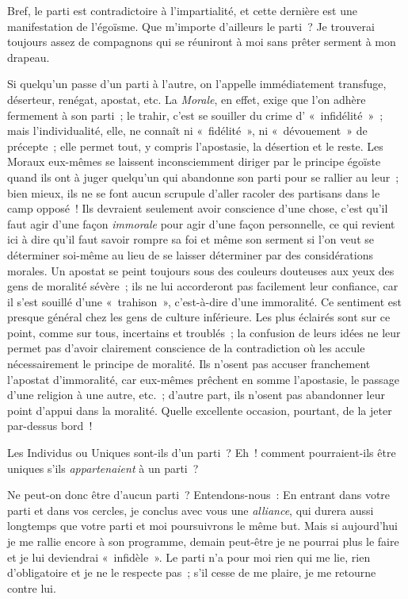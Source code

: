 \documentclass[french,twoside]{book} %
\begin{document}
Bref, le parti est contradictoire à l’impartialité, et cette dernière est une manifestation de l’égoïsme. Que m’importe d’ailleurs le parti ? Je trouverai toujours assez de compagnons qui se réuniront à moi sans prêter serment à mon drapeau.\par
Si quelqu’un passe d’un parti à l’autre, on l’appelle immédiatement transfuge, déserteur, renégat, apostat, etc. La \emph{Morale}, en effet, exige que l’on adhère fermement à son parti ; le trahir, c’est se souiller du crime d’ « infidélité » ; mais l’individualité, elle, ne connaît ni « fidélité », ni « dévouement » de précepte ; elle permet tout, y compris l’apostasie, la désertion et le reste. Les Moraux eux-mêmes se laissent inconsciemment diriger par le principe égoïste quand ils ont à juger quelqu’un qui abandonne son parti pour se rallier au leur ; bien mieux, ils ne se font aucun scrupule d’aller racoler des partisans dans le camp opposé ! Ils devraient seulement avoir conscience  d’une chose, c’est qu’il faut agir d’une façon \emph{immorale} pour agir d’une façon personnelle, ce qui revient ici à dire qu’il faut savoir rompre sa foi et même son serment si l’on veut se déterminer soi-même au lieu de se laisser déterminer par des considérations morales. Un apostat se peint toujours sous des couleurs douteuses aux yeux des gens de moralité sévère ; ils ne lui accorderont pas facilement leur confiance, car il s’est souillé d’une « trahison », c’est-à-dire d’une immoralité. Ce sentiment est presque général chez les gens de culture inférieure. Les plus éclairés sont sur ce point, comme sur tous, incertains et troublés ; la confusion de leurs idées ne leur permet pas d’avoir clairement conscience de la contradiction où les accule nécessairement le principe de moralité. Ils n’osent pas accuser franchement l’apostat d’immoralité, car eux-mêmes prêchent en somme l’apostasie, le passage d’une religion à une autre, etc. ; d’autre part, ils n’osent pas abandonner leur point d’appui dans la moralité. Quelle excellente occasion, pourtant, de la jeter par-dessus bord !\par
Les Individus ou Uniques sont-ils d’un parti ? Eh ! comment pourraient-ils être uniques s’ils \emph{appartenaient }à un parti ?\par
Ne peut-on donc être d’aucun parti ? Entendons-nous : En entrant dans votre parti et dans vos cercles, je conclus avec vous une \emph{alliance}, qui durera aussi longtemps que votre parti et moi poursuivrons le même but. Mais si aujourd’hui je me rallie encore à son programme, demain peut-être je ne pourrai plus le faire et je lui deviendrai « infidèle ». Le parti n’a pour moi rien qui me lie, rien d’obligatoire et je ne le respecte pas ; s’il cesse de me plaire, je me retourne contre lui.\par
\end{document}
